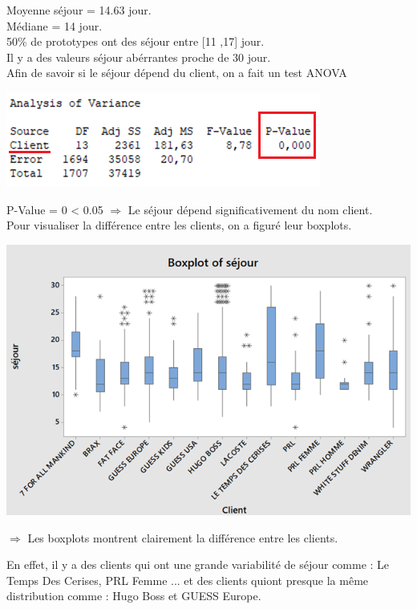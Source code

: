 \documentclass[12pt, a4paper]{thesis}
\begin{document}
 
Moyenne séjour = 14.63 jour.\\
Médiane = 14 jour. \\
50\% de prototypes ont des séjour entre [11 ,17] jour.\\
Il y a des valeurs séjour abérrantes proche de 30 jour.\\ 


Afin de savoir si le séjour dépend du client, on a fait un test ANOVA
\begin{center}
\includegraphics[scale=0.9]{anova.png}
\end{center}

P-Value = 0 < 0.05 $\Longrightarrow$ Le séjour dépend significativement du nom client.\\

Pour visualiser la différence entre les clients, on a figuré leur boxplots.

\begin{center}

\includegraphics[scale=0.7]{boxproto.png}

\end{center}

$\Longrightarrow$ Les boxplots montrent clairement la différence entre les clients.\

En effet, il y a des clients qui ont une grande variabilité de séjour comme : Le Temps Des Cerises, PRL Femme ... et des clients quiont presque la même distribution comme : Hugo Boss et GUESS Europe.
\end{document}
